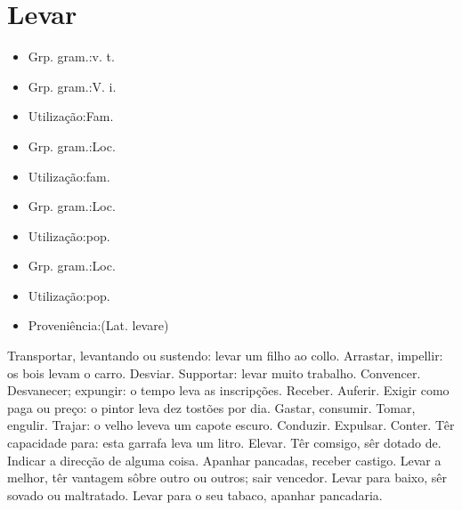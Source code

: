 \section{Levar}
\begin{itemize}
\item {Grp. gram.:v. t.}
\end{itemize}
\begin{itemize}
\item {Grp. gram.:V. i.}
\end{itemize}
\begin{itemize}
\item {Utilização:Fam.}
\end{itemize}
\begin{itemize}
\item {Grp. gram.:Loc.}
\end{itemize}
\begin{itemize}
\item {Utilização:fam.}
\end{itemize}
\begin{itemize}
\item {Grp. gram.:Loc.}
\end{itemize}
\begin{itemize}
\item {Utilização:pop.}
\end{itemize}
\begin{itemize}
\item {Grp. gram.:Loc.}
\end{itemize}
\begin{itemize}
\item {Utilização:pop.}
\end{itemize}
\begin{itemize}
\item {Proveniência:(Lat. \textunderscore levare\textunderscore )}
\end{itemize}
Transportar, levantando ou sustendo: \textunderscore levar um filho ao collo\textunderscore .
Arrastar, impellir: \textunderscore os bois levam o carro\textunderscore .
Desviar.
Supportar: \textunderscore levar muito trabalho\textunderscore .
Convencer.
Desvanecer; expungir: \textunderscore o tempo leva as inscripções\textunderscore .
Receber.
Auferir.
Exigir como paga ou preço: \textunderscore o pintor leva dez tostões por dia\textunderscore .
Gastar, consumir.
Tomar, engulir. Trajar: \textunderscore o velho leveva um capote escuro\textunderscore .
Conduzir.
Expulsar.
Conter.
Têr capacidade para: \textunderscore esta garrafa leva um litro\textunderscore .
Elevar.
Têr comsigo, sêr dotado de.
Indicar a direcção de alguma coisa.
Apanhar pancadas, receber castigo.
\textunderscore Levar a melhor\textunderscore , têr vantagem sôbre outro ou outros; sair vencedor.
\textunderscore Levar para baixo\textunderscore , sêr sovado ou maltratado.
\textunderscore Levar para o seu tabaco\textunderscore , apanhar pancadaria.

